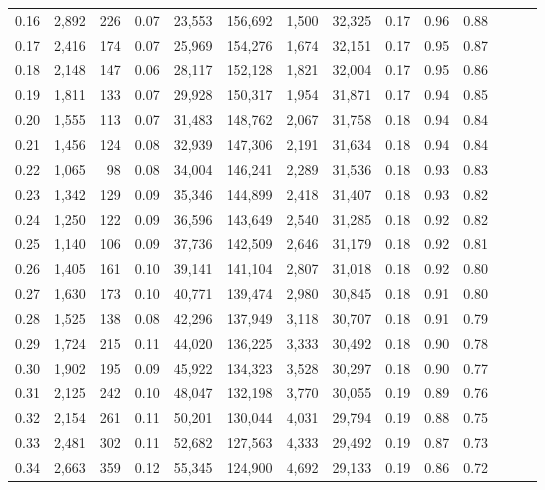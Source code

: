 \begin{tabular}{rrrrrrrrrrrrrr}
0.16 &  2,892 &  226 &  0.07 &   23,553 &  156,692 &   1,500 &  32,325 &  0.17 &  0.96 &      0.88 \\
0.17 &  2,416 &  174 &  0.07 &   25,969 &  154,276 &   1,674 &  32,151 &  0.17 &  0.95 &      0.87 \\
0.18 &  2,148 &  147 &  0.06 &   28,117 &  152,128 &   1,821 &  32,004 &  0.17 &  0.95 &      0.86 \\
0.19 &  1,811 &  133 &  0.07 &   29,928 &  150,317 &   1,954 &  31,871 &  0.17 &  0.94 &      0.85 \\
0.20 &  1,555 &  113 &  0.07 &   31,483 &  148,762 &   2,067 &  31,758 &  0.18 &  0.94 &      0.84 \\
0.21 &  1,456 &  124 &  0.08 &   32,939 &  147,306 &   2,191 &  31,634 &  0.18 &  0.94 &      0.84 \\
0.22 &  1,065 &   98 &  0.08 &   34,004 &  146,241 &   2,289 &  31,536 &  0.18 &  0.93 &      0.83 \\
0.23 &  1,342 &  129 &  0.09 &   35,346 &  144,899 &   2,418 &  31,407 &  0.18 &  0.93 &      0.82 \\
0.24 &  1,250 &  122 &  0.09 &   36,596 &  143,649 &   2,540 &  31,285 &  0.18 &  0.92 &      0.82 \\
0.25 &  1,140 &  106 &  0.09 &   37,736 &  142,509 &   2,646 &  31,179 &  0.18 &  0.92 &      0.81 \\
0.26 &  1,405 &  161 &  0.10 &   39,141 &  141,104 &   2,807 &  31,018 &  0.18 &  0.92 &      0.80 \\
0.27 &  1,630 &  173 &  0.10 &   40,771 &  139,474 &   2,980 &  30,845 &  0.18 &  0.91 &      0.80 \\
0.28 &  1,525 &  138 &  0.08 &   42,296 &  137,949 &   3,118 &  30,707 &  0.18 &  0.91 &      0.79 \\
0.29 &  1,724 &  215 &  0.11 &   44,020 &  136,225 &   3,333 &  30,492 &  0.18 &  0.90 &      0.78 \\
0.30 &  1,902 &  195 &  0.09 &   45,922 &  134,323 &   3,528 &  30,297 &  0.18 &  0.90 &      0.77 \\
0.31 &  2,125 &  242 &  0.10 &   48,047 &  132,198 &   3,770 &  30,055 &  0.19 &  0.89 &      0.76 \\
0.32 &  2,154 &  261 &  0.11 &   50,201 &  130,044 &   4,031 &  29,794 &  0.19 &  0.88 &      0.75 \\
0.33 &  2,481 &  302 &  0.11 &   52,682 &  127,563 &   4,333 &  29,492 &  0.19 &  0.87 &      0.73 \\
0.34 &  2,663 &  359 &  0.12 &   55,345 &  124,900 &   4,692 &  29,133 &  0.19 &  0.86 &      0.72 \\

\end{tabular}
